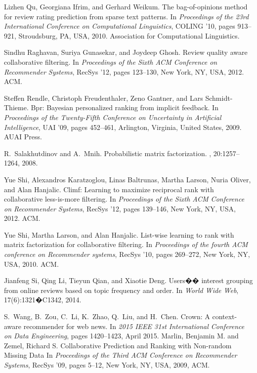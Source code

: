 \documentclass[sigconf]{acmart}
\begin{document}
\begin{thebibliography}{10}
Lizhen Qu, Georgiana Ifrim, and Gerhard Weikum.
\newblock The bag-of-opinions method for review rating prediction from sparse
  text patterns.
\newblock In {\em Proceedings of the 23rd International Conference on
  Computational Linguistics}, COLING '10, pages 913--921, Stroudsburg, PA, USA,
  2010. Association for Computational Linguistics.

Sindhu Raghavan, Suriya Gunasekar, and Joydeep Ghosh.
\newblock Review quality aware collaborative filtering.
\newblock In {\em Proceedings of the Sixth ACM Conference on Recommender
  Systems}, RecSys '12, pages 123--130, New York, NY, USA, 2012. ACM.

Steffen Rendle, Christoph Freudenthaler, Zeno Gantner, and Lars Schmidt-Thieme.
\newblock Bpr: Bayesian personalized ranking from implicit feedback.
\newblock In {\em Proceedings of the Twenty-Fifth Conference on Uncertainty in
  Artificial Intelligence}, UAI '09, pages 452--461, Arlington, Virginia,
  United States, 2009. AUAI Press.

R.~Salakhutdinov and A.~Mnih.
\newblock Probabilistic matrix factorization.
,
  20:1257--1264, 2008.

Yue Shi, Alexandros Karatzoglou, Linas Baltrunas, Martha Larson, Nuria Oliver,
  and Alan Hanjalic.
\newblock Climf: Learning to maximize reciprocal rank with collaborative
  less-is-more filtering.
\newblock In {\em Proceedings of the Sixth ACM Conference on Recommender
  Systems}, RecSys '12, pages 139--146, New York, NY, USA, 2012. ACM.

Yue Shi, Martha Larson, and Alan Hanjalic.
\newblock List-wise learning to rank with matrix factorization for
  collaborative filtering.
\newblock In {\em Proceedings of the fourth ACM conference on Recommender
  systems}, RecSys '10, pages 269--272, New York, NY, USA, 2010. ACM.

Jianfeng Si, Qing Li, Tieyun Qian, and Xiaotie Deng.
\newblock Users�� interest grouping from online reviews based on topic
  frequency and order.
\newblock In {\em World Wide Web}, 17(6):1321�C1342, 2014.

S.~Wang, B.~Zou, C.~Li, K.~Zhao, Q.~Liu, and H.~Chen.
\newblock Crown: A context-aware recommender for web news.
\newblock In {\em 2015 IEEE 31st International Conference on Data Engineering},
  pages 1420--1423, April 2015.
Marlin, Benjamin M. and Zemel, Richard S.
\newblock Collaborative Prediction and Ranking with Non-random Missing Data
\newblock In {\em Proceedings of the Third ACM Conference on Recommender Systems}, RecSys '09, pages 5--12, New York, NY, USA, 2009, ACM.


\end{thebibliography}
\end{document}

